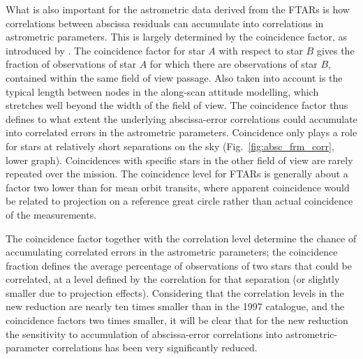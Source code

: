 \documentclass{aa}
\begin{document}
What is also important for the astrometric data derived from the FTARs is how 
correlations between abscissa residuals can accumulate into correlations 
in astrometric parameters. This is largely determined by the
coincidence factor, as introduced by \citet{fvl99b}. The coincidence factor 
for star $A$ with respect to star $B$ gives the fraction of observations of 
star $A$ for which there are observations of star $B$, contained within the 
same field of view passage. Also taken into account is the typical 
length between nodes in the along-scan attitude modelling, which stretches 
well beyond the width of the field of view. 
The coincidence factor thus defines 
to what extent the underlying abscissa-error correlations could accumulate 
into correlated errors in the astrometric parameters. Coincidence only plays 
a role for stars at relatively short separations on the sky 
(Fig.~\ref{fig:absc_frm_corr}, lower graph). Coincidences with specific stars 
in the other field of view are rarely repeated over the mission. The 
coincidence
level for FTARs is generally about a factor two lower than for mean orbit 
transits, where apparent coincidence would be related to projection on a 
reference great circle rather than actual coincidence of the measurements.

The coincidence factor together with the correlation level determine the 
chance of accumulating correlated errors in the astrometric parameters;
the coincidence fraction defines the average percentage of observations of 
two stars that could be correlated, at a level defined by the correlation 
for that separation (or slightly smaller due to projection effects). 
Considering that the correlation levels in the new reduction are nearly ten 
times smaller than in the 1997 catalogue, and the coincidence factors two 
times smaller, it will be clear that for the new reduction the sensitivity
to accumulation of abscissa-error correlations into astrometric-parameter 
correlations has been very significantly reduced.
\end{document}
